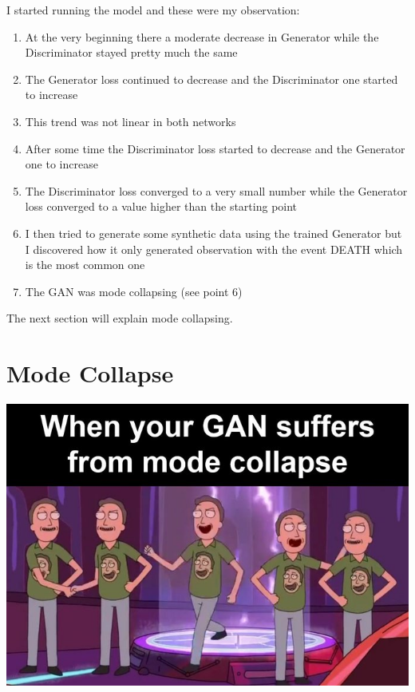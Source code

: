 \documentclass[
  letterpaper,
  DIV=11,
  numbers=noendperiod]{scrreprt}
\providecommand{\tightlist}{%
  \setlength{\itemsep}{0pt}\setlength{\parskip}{0pt}}\usepackage{longtable,booktabs,array}
\begin{document}
I started running the model and these were my observation:

\begin{enumerate}
\def\labelenumi{\arabic{enumi}.}
\tightlist
\item
  At the very beginning there a moderate decrease in Generator while the
  Discriminator stayed pretty much the same
\item
  The Generator loss continued to decrease and the Discriminator one
  started to increase
\item
  This trend was not linear in both networks
\item
  After some time the Discriminator loss started to decrease and the
  Generator one to increase
\item
  The Discriminator loss converged to a very small number while the
  Generator loss converged to a value higher than the starting point
\item
  I then tried to generate some synthetic data using the trained
  Generator but I discovered how it only generated observation with the
  event DEATH which is the most common one
\item
  The GAN was mode collapsing (see point 6)
\end{enumerate}

The next section will explain mode collapsing.

\hypertarget{mode-collapse}{%
\chapter{Mode Collapse}\label{mode-collapse}}

\includegraphics{morty_collapse.jpg}
\end{document}
